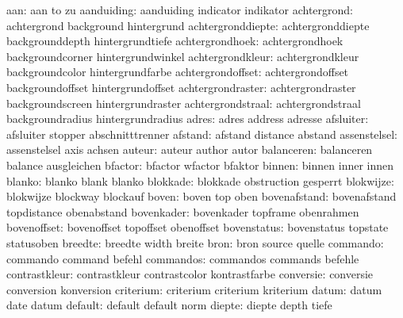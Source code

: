                  aan:  aan                  to                   zu
          aanduiding:  aanduiding           indicator            indikator
         achtergrond:  achtergrond          background           hintergrund
   achtergronddiepte:  achtergronddiepte    backgrounddepth      hintergrundtiefe
     achtergrondhoek:  achtergrondhoek      backgroundcorner     hintergrundwinkel
    achtergrondkleur:  achtergrondkleur     backgroundcolor      hintergrundfarbe
   achtergrondoffset:  achtergrondoffset    backgroundoffset     hintergrundoffset
   achtergrondraster:  achtergrondraster    backgroundscreen     hintergrundraster
   achtergrondstraal:  achtergrondstraal    backgroundradius     hintergrundradius
               adres:  adres                address              adresse
           afsluiter:  afsluiter            stopper              abschnitttrenner
             afstand:  afstand              distance             abstand
        assenstelsel:  assenstelsel         axis                 achsen
              auteur:  auteur               author               autor
          balanceren:  balanceren           balance              ausgleichen
             bfactor:  bfactor              wfactor              bfaktor
              binnen:  binnen               inner                innen
              blanko:  blanko               blank                blanko
            blokkade:  blokkade             obstruction          gesperrt
           blokwijze:  blokwijze            blockway             blockauf
               boven:  boven                top                  oben
        bovenafstand:  bovenafstand         topdistance          obenabstand
          bovenkader:  bovenkader           topframe             obenrahmen
         bovenoffset:  bovenoffset          topoffset            obenoffset
         bovenstatus:  bovenstatus          topstate             statusoben
             breedte:  breedte              width                breite
                bron:  bron                 source               quelle
            commando:  commando             command              befehl
           commandos:  commandos            commands             befehle
       contrastkleur:  contrastkleur        contrastcolor        kontrastfarbe
           conversie:  conversie            conversion           konversion
           criterium:  criterium            criterium            kriterium
               datum:  datum                date                 datum
             default:  default              default              norm
              diepte:  diepte               depth                tiefe
